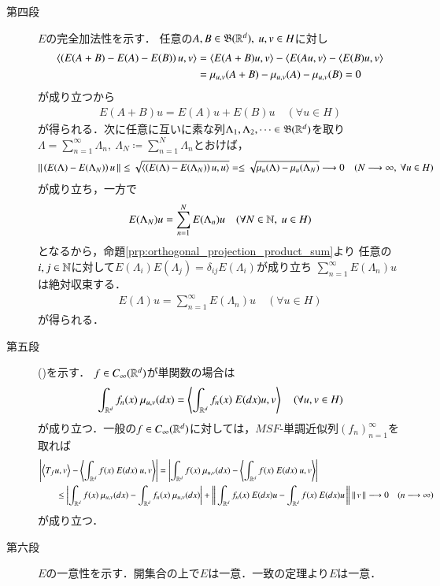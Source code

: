 \begin{prf}
\begin{description}
			\item[第四段] $E$の完全加法性を示す．
				任意の$A,B \in \mathfrak{B}(\mathbb{R}^d),\ u,v \in H$に対し
				\begin{align}
					\inprod<\left(E(A+B) - E(A) - E(B) \right)u,v>
					&= \inprod<E(A+B)u,v> - \inprod<E(Au,v> - \inprod<E(B)u,v> \\
					&= \mu_{u,v}(A+B) - \mu_{u,v}(A) - \mu_{u,v}(B)
					= 0
				\end{align}
				が成り立つから
				\begin{align}
					E(A+B)u = E(A)u + E(B)u 
					\quad (\forall u \in H)
				\end{align}
				が得られる．次に任意に互いに素な列$\Lambda_1,\Lambda_2,\cdots \in \mathfrak{B}(\mathbb{R}^d)$を取り
				$\Lambda = \sum_{n=1}^{\infty} \Lambda_n,\ \Lambda_N \coloneqq \sum_{n=1}^{N} \Lambda_n$とおけば，
				\begin{align}
					\Norm{\left( E(\Lambda) - E(\Lambda_N) \right)u}{}
					\leq \sqrt{\inprod<\left( E(\Lambda) - E(\Lambda_N) \right)u, u>}
					= \leq \sqrt{\mu_u(\Lambda) - \mu_u(\Lambda_N)}
					\longrightarrow 0 \quad (N \longrightarrow \infty,\ \forall u \in H)
				\end{align}
				が成り立ち，一方で
				\begin{align}
					E(\Lambda_N) u = \sum_{n=1}^{N} E(\Lambda_n) u \quad (\forall N \in \mathbb{N},\ u \in H)
				\end{align}
				となるから，命題\ref{prp:orthogonal_projection_product_sum}より
				任意の$i,j \in \mathbb{N}$に対して$E(\Lambda_i)E(\Lambda_j) = \delta_{ij}E(\Lambda_i)$が成り立ち
				$\sum_{n=1}^{\infty} E(\Lambda_n) u$は絶対収束する．
				\begin{align}
					E(\Lambda) u = \sum_{n=1}^{\infty} E(\Lambda_n) u \quad (\forall u \in H)
				\end{align}
				が得られる．
			
			\item[第五段]
				()を示す．
				$f \in C_\infty (\mathbb{R}^d)$が単関数の場合は
				\begin{align}
					\int_{\R^d} f_n(x)\ \mu_{u,v}(dx) = \inprod<\int_{\R^d} f_n(x)\ E(dx) u, v>
					\quad (\forall u,v \in H)
				\end{align}
				が成り立つ．一般の$f \in C_\infty (\mathbb{R}^d)$に対しては，$MSF$-単調近似列$(f_n)_{n=1}^{\infty}$を取れば
				\begin{align}
					&\left| \inprod<T_f u,v> - \inprod<\int_{\R^d} f(x)\ E(dx)\ u, v> \right|
					= \left| \int_{\R^d} f(x)\ \mu_{u,v}(dx) - \inprod<\int_{\R^d} f(x)\ E(dx)\ u, v> \right| \\
					&\qquad \leq \left| \int_{\R^d} f(x)\ \mu_{u,v}(dx) - \int_{\R^d} f_n(x)\ \mu_{u,v}(dx) \right| 
						+ \Norm{\int_{\R^d} f_n(x)\ E(dx) u - \int_{\R^d} f(x)\ E(dx) u}{} \Norm{v}{}
					\longrightarrow 0 \quad (n \longrightarrow \infty)
				\end{align}
				が成り立つ．
				
			\item[第六段]
				$E$の一意性を示す．開集合の上で$E$は一意．一致の定理より$E$は一意．
			\QED
		\end{description}
	\end{prf}
	